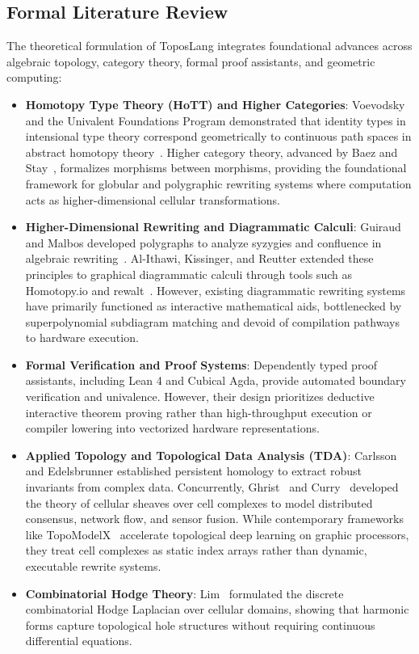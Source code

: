 \documentclass[10pt,a4paper]{article}
\begin{document}
\subsection{Formal Literature Review}
The theoretical formulation of ToposLang integrates foundational advances across algebraic topology, category theory, formal proof assistants, and geometric computing:

\begin{itemize}
    \item \textbf{Homotopy Type Theory (HoTT) and Higher Categories}: Voevodsky and the Univalent Foundations Program demonstrated that identity types in intensional type theory correspond geometrically to continuous path spaces in abstract homotopy theory~\cite{voevodsky2013homotopy}. Higher category theory, advanced by Baez and Stay~\cite{baez2010physics}, formalizes morphisms between morphisms, providing the foundational framework for globular and polygraphic rewriting systems where computation acts as higher-dimensional cellular transformations.
    \item \textbf{Higher-Dimensional Rewriting and Diagrammatic Calculi}: Guiraud and Malbos developed polygraphs to analyze syzygies and confluence in algebraic rewriting~\cite{guiraud2012higher}. Al-Ithawi, Kissinger, and Reutter extended these principles to graphical diagrammatic calculi through tools such as Homotopy.io and rewalt~\cite{kissinger2019homotopy}. However, existing diagrammatic rewriting systems have primarily functioned as interactive mathematical aids, bottlenecked by superpolynomial subdiagram matching and devoid of compilation pathways to hardware execution.
    \item \textbf{Formal Verification and Proof Systems}: Dependently typed proof assistants, including Lean 4 and Cubical Agda, provide automated boundary verification and univalence. However, their design prioritizes deductive interactive theorem proving rather than high-throughput execution or compiler lowering into vectorized hardware representations.
    \item \textbf{Applied Topology and Topological Data Analysis (TDA)}: Carlsson~\cite{carlsson2009topology} and Edelsbrunner established persistent homology to extract robust invariants from complex data. Concurrently, Ghrist~\cite{ghrist2014elementary} and Curry~\cite{curry2014sheaves} developed the theory of cellular sheaves over cell complexes to model distributed consensus, network flow, and sensor fusion. While contemporary frameworks like TopoModelX~\cite{topomodelx2023} accelerate topological deep learning on graphic processors, they treat cell complexes as static index arrays rather than dynamic, executable rewrite systems.
    \item \textbf{Combinatorial Hodge Theory}: Lim~\cite{lim2020hodge} formulated the discrete combinatorial Hodge Laplacian over cellular domains, showing that harmonic forms capture topological hole structures without requiring continuous differential equations.
\end{itemize}
\end{document}
